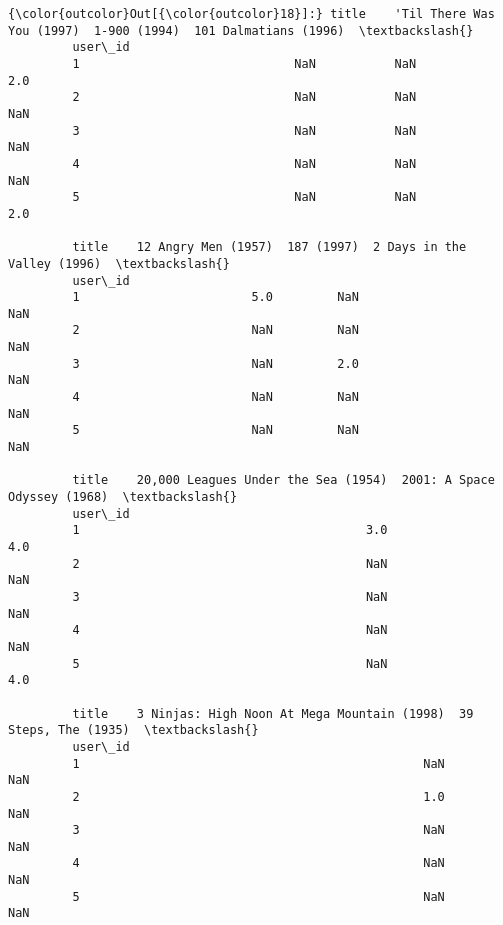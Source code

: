 \documentclass[11pt]{article}
\begin{document}
\begin{Verbatim}[commandchars=\\\{\}]
{\color{outcolor}Out[{\color{outcolor}18}]:} title    'Til There Was You (1997)  1-900 (1994)  101 Dalmatians (1996)  \textbackslash{}
         user\_id                                                                   
         1                              NaN           NaN                    2.0   
         2                              NaN           NaN                    NaN   
         3                              NaN           NaN                    NaN   
         4                              NaN           NaN                    NaN   
         5                              NaN           NaN                    2.0   
         
         title    12 Angry Men (1957)  187 (1997)  2 Days in the Valley (1996)  \textbackslash{}
         user\_id                                                                 
         1                        5.0         NaN                          NaN   
         2                        NaN         NaN                          NaN   
         3                        NaN         2.0                          NaN   
         4                        NaN         NaN                          NaN   
         5                        NaN         NaN                          NaN   
         
         title    20,000 Leagues Under the Sea (1954)  2001: A Space Odyssey (1968)  \textbackslash{}
         user\_id                                                                      
         1                                        3.0                           4.0   
         2                                        NaN                           NaN   
         3                                        NaN                           NaN   
         4                                        NaN                           NaN   
         5                                        NaN                           4.0   
         
         title    3 Ninjas: High Noon At Mega Mountain (1998)  39 Steps, The (1935)  \textbackslash{}
         user\_id                                                                      
         1                                                NaN                   NaN   
         2                                                1.0                   NaN   
         3                                                NaN                   NaN   
         4                                                NaN                   NaN   
         5                                                NaN                   NaN   
         

\end{Verbatim}
\end{document}
